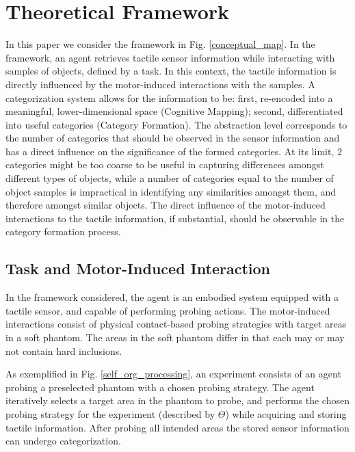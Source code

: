 \documentclass[]{interact}
\theoremstyle{plain}%
\theoremstyle{definition}
\theoremstyle{remark}
\begin{document}
\section{Theoretical Framework} \label{sec_th_framework}

In this paper we consider the framework in Fig. \ref{conceptual_map}. In the framework, an agent 
retrieves tactile sensor information while interacting with samples of objects, defined by a task. 
In this context, the tactile information is directly influenced by the motor-induced interactions with the samples. 
A categorization system allows for the information to be: first, re-encoded into a meaningful, 
lower-dimensional space (Cognitive Mapping); second, differentiated into useful categories 
(Category Formation). The abstraction level corresponds to the number of categories that should be observed in the 
sensor information and has a direct influence on the significance of the formed categories. 
At its limit, 2 categories might be too coarse to be useful in capturing differences amongst different types of 
objects, while a number of categories equal to the number of object samples is impractical in identifying any 
similarities amongst them, and therefore amongst similar objects. The direct influence of the motor-induced 
interactions to the tactile information, if substantial, should be observable in the category formation process. 

\subsection{Task and Motor-Induced Interaction}\label{sec_int}
In the framework considered, the agent is an embodied system equipped with a tactile sensor,
and capable of performing probing actions. The motor-induced interactions consist of physical 
contact-based probing strategies with target areas in a soft phantom. The areas in the soft phantom differ in that 
each may or may not contain hard inclusions.

As exemplified in Fig. \ref{self_org_processing}, an experiment consists of an agent probing a preselected phantom 
with a chosen probing strategy. The agent iteratively selects a target area in the phantom to probe, and performs 
the chosen probing strategy for the experiment (described by $\Theta$) while acquiring and storing tactile 
information. After probing all intended areas the stored sensor information can undergo categorization.
\end{document}
